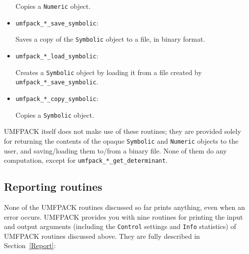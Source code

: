 \documentclass[11pt]{article}
\begin{document}
\begin{itemize}
    Copies a {\tt Numeric} object.

\item {\tt umfpack\_*\_save\_symbolic}:

    Saves a copy of the {\tt Symbolic} object to a file, in binary format.

\item {\tt umfpack\_*\_load\_symbolic}:

    Creates a {\tt Symbolic} object by loading it from a file created
    by {\tt umfpack\_*\_save\_symbolic}.

\item {\tt umfpack\_*\_copy\_symbolic}:

    Copies a {\tt Symbolic} object.

\end{itemize}

UMFPACK itself does not make use of these routines;
they are provided solely for returning the contents of the opaque
{\tt Symbolic} and {\tt Numeric} objects to the user, and saving/loading
them to/from a binary file.  None of them do any computation, except for
{\tt umfpack\_*\_get\_determinant}.

\subsection{Reporting routines}
\label{Reporting}

None of the UMFPACK routines discussed so far prints anything, even when an
error occurs.  UMFPACK provides you with nine routines for printing the input
and output arguments (including the {\tt Control} settings and {\tt Info}
statistics) of UMFPACK routines discussed above.  They are fully described in
Section~\ref{Report}:
\end{document}
